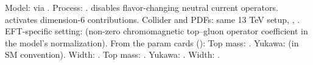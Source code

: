\markdownRendererUlItem Model:  via .\markdownRendererUlItemEnd 
\markdownRendererUlItem Process: .\markdownRendererInterblockSeparator
{}\markdownRendererUlBeginTight
\markdownRendererUlItem {} disables flavor-changing neutral current operators.\markdownRendererUlItemEnd 
\markdownRendererUlItem {} activates dimension-6 contributions.\markdownRendererUlItemEnd 
\markdownRendererUlEndTight \markdownRendererUlItemEnd 
\markdownRendererUlItem Collider and PDFs: same 13 TeV setup, , .\markdownRendererUlItemEnd 
\markdownRendererUlItem EFT-specific setting:  (non-zero chromomagnetic top–gluon operator coefficient in the model’s normalization).\markdownRendererUlItemEnd 
\markdownRendererUlEndTight \markdownRendererOlItemEnd 
\markdownRendererOlEnd \markdownRendererInterblockSeparator
{}
\markdownRendererSectionEnd \markdownRendererSectionBegin
{}\markdownRendererInterblockSeparator
{}From the param cards ():\markdownRendererInterblockSeparator
{}\markdownRendererUlBegin
\markdownRendererUlItem {}\markdownRendererInterblockSeparator
{}\markdownRendererUlBeginTight
\markdownRendererUlItem Top mass: .\markdownRendererUlItemEnd 
\markdownRendererUlItem Yukawa:  (in SM convention).\markdownRendererUlItemEnd 
\markdownRendererUlItem Width: .\markdownRendererUlItemEnd 
\markdownRendererUlEndTight \markdownRendererUlItemEnd 
\markdownRendererUlItem {}\markdownRendererInterblockSeparator
{}\markdownRendererUlBeginTight
\markdownRendererUlItem Top mass: .\markdownRendererUlItemEnd 
\markdownRendererUlItem Yukawa: .\markdownRendererUlItemEnd 
\markdownRendererUlItem Width: .\markdownRendererUlItemEnd 
